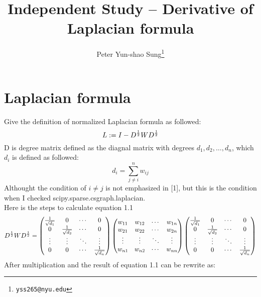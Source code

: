\documentclass[final]{siamltexmm}
\title{Independent Study -- Derivative of Laplacian formula}
\author{Peter Yun-shao Sung\thanks{\tt yss265@nyu.edu} }
\begin{document}
\maketitle

\pagestyle{myheadings}
\thispagestyle{plain}

\section{Laplacian formula}
Give the definition of normalized Laplacian formula as followed:
\begin{equation}
L := I - D^{1 \over 2}W D^{1 \over 2}
\end{equation}
D is degree matrix defined as the diagnal matrix with degrees $d_1, d_2, \ldots, d_n$, which $d_i$ is defined as followed:
\begin{equation}
d_i = \displaystyle\sum_{j \neq i}^{n} w_{ij}
\end{equation}
Althought the condition of $i \neq j$ is not emphasized in [1], but this is the condition when I checked scipy.sparse.csgraph.laplacian.\\
Here is the steps to calculate equation 1.1
\begin{equation}
D^{1 \over 2}W D^{1 \over 2} =
\begin{pmatrix}
  {1 \over \sqrt{d_1}} & 0 & \cdots & 0 \\
  0 & {1 \over \sqrt{d_2}} & \cdots & 0 \\
  \vdots  & \vdots  & \ddots & \vdots  \\
  0 & 0 & \cdots & {1 \over \sqrt{d_n}}
\end{pmatrix}
\begin{pmatrix}
  w_{11} & w_{12} & \cdots & w_{1n} \\
  w_{21} & w_{22} & \cdots & w_{2n} \\
  \vdots  & \vdots  & \ddots & \vdots  \\
  w_{n1} & w_{n2} & \cdots & w_{nn}
\end{pmatrix}
\begin{pmatrix}
  {1 \over \sqrt{d_1}} & 0 & \cdots & 0 \\
  0 & {1 \over \sqrt{d_2}} & \cdots & 0 \\
  \vdots  & \vdots  & \ddots & \vdots  \\
  0 & 0 & \cdots & {1 \over \sqrt{d_n}}
\end{pmatrix}
\end{equation}
After multiplication and the result of equation 1.1 can be rewrite as:
\end{document}
